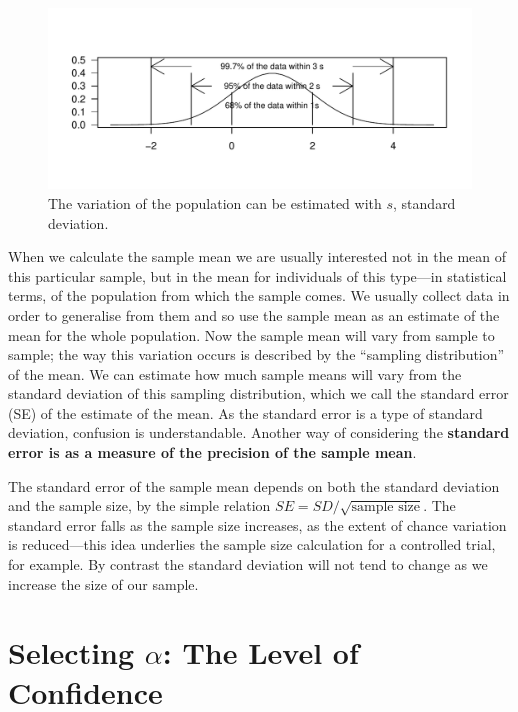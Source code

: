 \documentclass{tufte-handout}\usepackage[]{graphicx}\usepackage[]{color}
\makeatletter
\def\maxwidth{ %
  \ifdim\Gin@nat@width>\linewidth
    \linewidth
  \else
    \Gin@nat@width
  \fi
}
\newenvironment{knitrout}{}{} %
\makeatother
\begin{document}
\begin{figure}
\begin{knitrout}
\color{fgcolor}
\includegraphics[width=\maxwidth]{figure/unnamed-chunk-17-1} 

\end{knitrout}
\caption{The variation of the population can be estimated with $s$, standard deviation.}
\label{fig:3rule}
\end{figure}

When we calculate the sample mean we are usually interested not in the mean of this particular sample, but in the mean for individuals of this type---in statistical terms, of the population from which the sample comes. We usually collect data in order to generalise from them and so use the sample mean as an estimate of the mean for the whole population. Now the sample mean will vary from sample to sample; the way this variation occurs is described by the ``sampling distribution'' of the mean. We can estimate how much sample means will vary from the standard deviation of this sampling distribution, which we call the standard error (SE) of the estimate of the mean. As the standard error is a type of standard deviation, confusion is understandable. Another way of considering the \textbf{standard error is as a measure of the precision of the sample mean}.

The standard error of the sample mean depends on both the standard deviation and the sample size, by the simple relation $SE = SD/\sqrt{\textrm{sample size}}$. The standard error falls as the sample size increases, as the extent of chance variation is reduced---this idea underlies the sample size calculation for a controlled trial, for example. By contrast the standard deviation will not tend to change as we increase the size of our sample.

\section{Selecting $\alpha$: The Level of Confidence}
\end{document}
